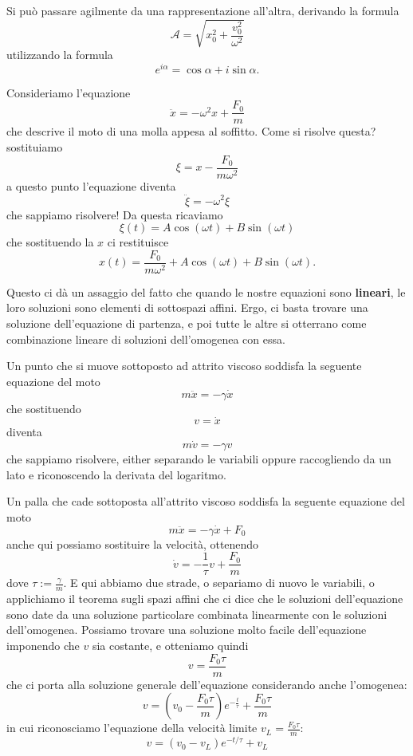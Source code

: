 \documentclass[11pt]{scrartcl}
\begin{document}
	Si può passare agilmente da una rappresentazione all'altra, derivando la formula
	$$\mathcal{A}=\sqrt{x_0^2+\frac{v_0^2}{\omega^2}}$$
	utilizzando la formula 
	$$e^{i\alpha}=\cos\alpha+i\sin\alpha.$$
	\begin{example}
		Consideriamo l'equazione
		$$\ddot{x}=-\omega^2 x + \frac{F_0}{m}$$
		che descrive il moto di una molla appesa al soffitto. Come si risolve questa? sostituiamo
		$$\xi = x-\frac{F_0}{m\omega^2}$$
		a questo punto l'equazione diventa
		$$\ddot{\xi}=-\omega^2\xi$$
		che sappiamo risolvere! Da questa ricaviamo
		$$\xi(t)=A\cos(\omega t)+B\sin(\omega t)$$
		che sostituendo la $x$ ci restituisce
		$$x(t)=\frac{F_0}{m\omega^2}+A\cos(\omega t)+B\sin(\omega t).$$
	\end{example}
	Questo ci dà un assaggio del fatto che quando le nostre equazioni sono \textbf{lineari}, le loro soluzioni sono elementi di sottospazi affini. Ergo, ci basta trovare una soluzione dell'equazione di partenza, e poi tutte le altre si otterrano come combinazione lineare di soluzioni dell'omogenea con essa.
	\begin{example}
		Un punto che si muove sottoposto ad attrito viscoso soddisfa la seguente equazione del moto
		$$m\ddot{x}=-\gamma \dot{x}$$
		che sostituendo 
		$$v=\dot{x}$$
		diventa
		$$m\dot{v}=-\gamma v$$
		che sappiamo risolvere, either separando le variabili oppure raccogliendo da un lato e riconoscendo la derivata del logaritmo.
	\end{example}
	\begin{example}
		Un palla che cade sottoposta all'attrito viscoso soddisfa la seguente equazione del moto
		$$m\ddot{x}=-\gamma \dot{x}+F_0$$
		anche qui possiamo sostituire la velocità, ottenendo
		$$\dot{v}=-\frac{1}{\tau}v+\frac{F_0}{m}$$
		dove $\tau:=\frac{\gamma}{m}$.  E qui abbiamo due strade, o separiamo di nuovo le variabili, o applichiamo il teorema sugli spazi affini che ci dice che le soluzioni dell'equazione sono date da una soluzione particolare combinata linearmente con le soluzioni dell'omogenea. Possiamo trovare una soluzione molto facile dell'equazione imponendo che $v$ sia costante, e otteniamo quindi
		$$v=\frac{F_0 \tau}{m}$$
		che ci porta alla soluzione generale dell'equazione considerando anche l'omogenea:
		$$v=\left(v_0-\frac{F_0 \tau}{m}\right)e^{-\frac{t}{\tau}}+\frac{F_0\tau }{m}$$
		in cui riconosciamo l'equazione della velocità limite $v_L=\frac{F_0 \tau}{m}$:
		$$v=(v_0-v_L)e^{-t/\tau}+v_L$$
	\end{example}
	
\end{document}
